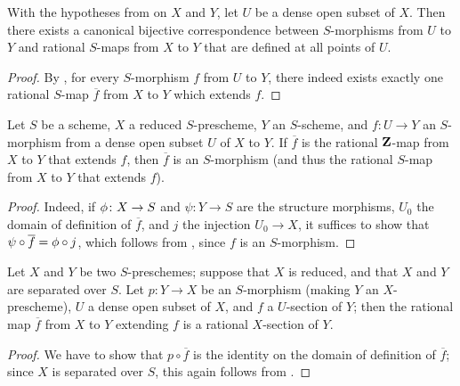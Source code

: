 \begin{cor}[7.2.3]
\label{1.7.2.3}
With the hypotheses from  on $X$ and $Y$, let $U$ be a dense open subset of $X$.
Then there exists a canonical bijective correspondence between $S$-morphisms from $U$ to $Y$ and rational $S$-maps from $X$ to $Y$ that are defined at all points of $U$.
\end{cor}

\begin{proof}
\label{proof-1.7.2.3}
By , for every $S$-morphism $f$ from $U$ to $Y$, there indeed exists exactly one rational $S$-map $\overline{f}$ from $X$ to $Y$ which extends $f$.
\end{proof}

\begin{cor}[7.2.4]
\label{1.7.2.4}
Let $S$ be a scheme, $X$ a reduced $S$-prescheme, $Y$ an $S$-scheme, and $f\colon U\to Y$ an $S$-morphism from a dense open subset $U$ of $X$ to $Y$.
If $\overline{f}$ is the rational $\mathbf{Z}$-map from $X$ to $Y$ that extends $f$, then $\overline{f}$ is an $S$-morphism (and thus the rational $S$-map from $X$ to $Y$ that extends $f$).
\end{cor}

\begin{proof}
\label{proof-1.7.2.4}
Indeed, if $\phi\colon X\to S$ and $\psi\colon Y\to S$ are the structure morphisms, $U_0$ the domain of definition of $\overline{f}$, and $j$ the injection $U_0\to X$, it suffices to show that $\psi\circ\overline{f}=\phi\circ j$, which follows from , since $f$ is an $S$-morphism.
\end{proof}

\begin{cor}[7.2.5]
\label{1.7.2.5}
Let $X$ and $Y$ be two $S$-preschemes; suppose that $X$ is reduced, and that $X$ and $Y$ are separated over $S$.
Let $p\colon Y\to X$ be an $S$-morphism (making $Y$ an $X$-prescheme), $U$ a dense open subset of $X$, and $f$ a $U$-section of $Y$; then the rational map $\overline{f}$ from $X$ to $Y$ extending $f$ is a rational $X$-section of $Y$.
\end{cor}

\begin{proof}
\label{proof-1.7.2.5}
We have to show that $p\circ\overline{f}$ is the identity on the domain of definition of $\overline{f}$; since $X$ is separated over $S$, this again follows from .
\end{proof}

